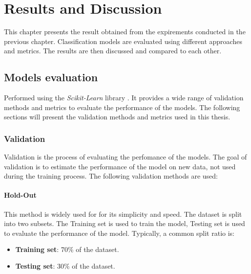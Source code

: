 %
%
\hypersetup{colorlinks=true, linkcolor=red}
\hypersetup{citecolor=blue}

\chapter{Results and Discussion}

    This chapter presents the result obtained from the expirements conducted in the previous chapter. Classification models are evaluated using different approaches and metrics. The results are then discussed and compared to each other.

    \section{Models evaluation}

        Performed using the \textit{Scikit-Learn} library \cite{sklearn_api}. It provides a wide range of validation methods and metrics to evaluate the performance of the models. The following sections will present the validation methods and metrics used in this thesis.

        \subsection{Validation}

            Validation is the process of evaluating the perfomance of the models. The goal of validation is to estimate the performance of the model on new data, not used during the training process. The following validation methods are used:

            \subsubsection{Hold-Out}

                This method is widely used for for its simplicity and speed. The dataset is split into two subsets. The Training set is used to train the model, Testing set is used to evaluate the performance of the model. Typically, a common split ratio is:
                \begin{itemize}
                    \item \textbf{Training set}: 70\% of the dataset.
                    \item \textbf{Testing set}: 30\% of the dataset.
                \end{itemize}
            
